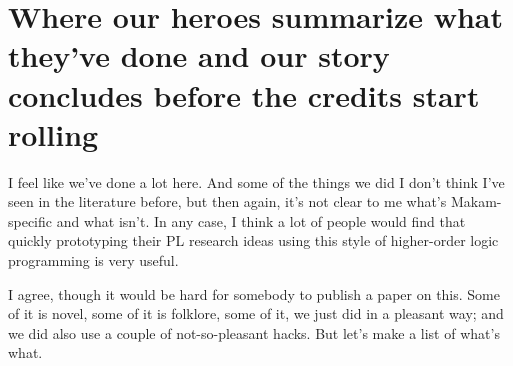 \section{Where our heroes summarize what they've done and our story
concludes before the credits start
rolling}\label{where-our-heroes-summarize-what-theyve-done-and-our-story-concludes-before-the-credits-start-rolling}

\heroSTUDENT{} I feel like we've done a lot here. And some of the things we
did I don't think I've seen in the literature before, but then again,
it's not clear to me what's Makam-specific and what isn't. In any case,
I think a lot of people would find that quickly prototyping their PL
research ideas using this style of higher-order logic programming is
very useful.

\heroADVISOR{} I agree, though it would be hard for somebody to publish a
paper on this. Some of it is novel, some of it is folklore, some of it,
we just did in a pleasant way; and we did also use a couple of
not-so-pleasant hacks. But let's make a list of what's what.

\vspace{-0.5em}

